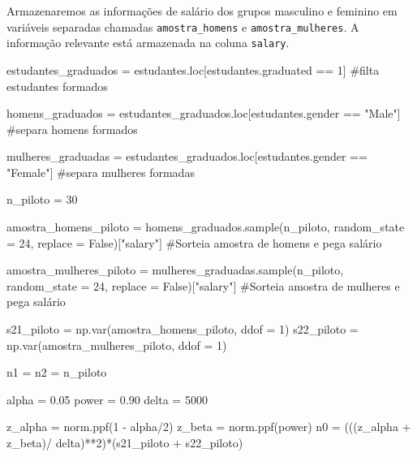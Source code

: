 \documentclass[
  letterpaper,
  DIV=11,
  numbers=noendperiod]{scrreprt}
\newenvironment{Shaded}{\begin{snugshade}}{\end{snugshade}}
\newcommand{\CommentTok}[1]{\textcolor[rgb]{0.37,0.37,0.37}{#1}}
\newcommand{\DecValTok}[1]{\textcolor[rgb]{0.68,0.00,0.00}{#1}}
\newcommand{\FloatTok}[1]{\textcolor[rgb]{0.68,0.00,0.00}{#1}}
\newcommand{\NormalTok}[1]{\textcolor[rgb]{0.00,0.23,0.31}{#1}}
\newcommand{\OperatorTok}[1]{\textcolor[rgb]{0.37,0.37,0.37}{#1}}
\newcommand{\StringTok}[1]{\textcolor[rgb]{0.13,0.47,0.30}{#1}}
\newcommand{\VariableTok}[1]{\textcolor[rgb]{0.07,0.07,0.07}{#1}}
\begin{document}
Armazenaremos as informações de salário dos grupos masculino e feminino
em variáveis separadas chamadas \texttt{amostra\_homens} e
\texttt{amostra\_mulheres}. A informação relevante está armazenada na
coluna \texttt{salary}.

\begin{Shaded}
\begin{Highlighting}[]
\NormalTok{estudantes\_graduados }\OperatorTok{=}\NormalTok{ estudantes.loc[estudantes.graduated }\OperatorTok{==} \DecValTok{1}\NormalTok{] }\CommentTok{\#filta estudantes formados}

\NormalTok{homens\_graduados }\OperatorTok{=}\NormalTok{ estudantes\_graduados.loc[estudantes.gender }\OperatorTok{==} \StringTok{"Male"}\NormalTok{] }\CommentTok{\#separa homens formados}

\NormalTok{mulheres\_graduadas }\OperatorTok{=}\NormalTok{ estudantes\_graduados.loc[estudantes.gender }\OperatorTok{==} \StringTok{"Female"}\NormalTok{] }\CommentTok{\#separa mulheres formadas}

\NormalTok{n\_piloto }\OperatorTok{=} \DecValTok{30}

\NormalTok{amostra\_homens\_piloto }\OperatorTok{=}\NormalTok{ homens\_graduados.sample(n\_piloto, random\_state }\OperatorTok{=} \DecValTok{24}\NormalTok{, replace }\OperatorTok{=} \VariableTok{False}\NormalTok{)[}\StringTok{"salary"}\NormalTok{] }\CommentTok{\#Sorteia amostra de homens e pega salário}

\NormalTok{amostra\_mulheres\_piloto }\OperatorTok{=}\NormalTok{ mulheres\_graduadas.sample(n\_piloto, random\_state }\OperatorTok{=} \DecValTok{24}\NormalTok{, replace }\OperatorTok{=} \VariableTok{False}\NormalTok{)[}\StringTok{"salary"}\NormalTok{] }\CommentTok{\#Sorteia amostra de mulheres e pega salário}

\NormalTok{s21\_piloto }\OperatorTok{=}\NormalTok{ np.var(amostra\_homens\_piloto, ddof }\OperatorTok{=} \DecValTok{1}\NormalTok{)}
\NormalTok{s22\_piloto }\OperatorTok{=}\NormalTok{ np.var(amostra\_mulheres\_piloto, ddof }\OperatorTok{=} \DecValTok{1}\NormalTok{)}

\NormalTok{n1 }\OperatorTok{=}\NormalTok{ n2 }\OperatorTok{=}\NormalTok{ n\_piloto}


\NormalTok{alpha }\OperatorTok{=} \FloatTok{0.05} 
\NormalTok{power }\OperatorTok{=} \FloatTok{0.90} 
\NormalTok{delta }\OperatorTok{=} \DecValTok{5000} 

\NormalTok{z\_alpha }\OperatorTok{=}\NormalTok{ norm.ppf(}\DecValTok{1} \OperatorTok{{-}}\NormalTok{ alpha}\OperatorTok{/}\DecValTok{2}\NormalTok{) }
\NormalTok{z\_beta }\OperatorTok{=}\NormalTok{ norm.ppf(power) }
\NormalTok{n0 }\OperatorTok{=}\NormalTok{ (((z\_alpha }\OperatorTok{+}\NormalTok{ z\_beta)}\OperatorTok{/}\NormalTok{ delta)}\OperatorTok{**}\DecValTok{2}\NormalTok{)}\OperatorTok{*}\NormalTok{(s21\_piloto }\OperatorTok{+}\NormalTok{ s22\_piloto) }


\end{Highlighting}
\end{Shaded}
\end{document}

